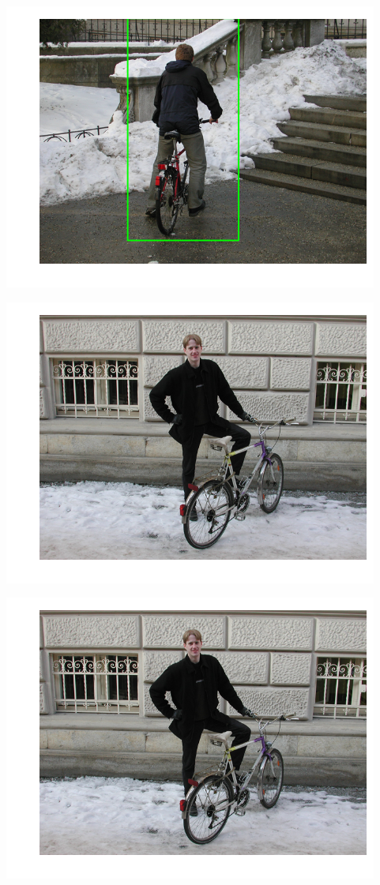 \includegraphics{facedetection_files/facedetection_62_5.png}

\includegraphics{facedetection_files/facedetection_62_6.png}

\includegraphics{facedetection_files/facedetection_62_7.png}

